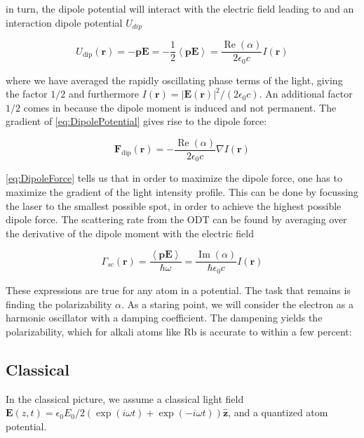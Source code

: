 in turn, the dipole potential will interact with the electric field leading to and an interaction dipole potential $U_{dip}$

\begin{equation}\label{eq:DipolePotential}
	U_{\text{dip}}(\mathbf{r}) = -\mathbf{p}\mathbf{E} = 
	-\frac{1}{2} \left\langle \mathbf{p}\mathbf{E} \right\rangle = \frac{\operatorname{Re}(\alpha)}{2\epsilon_0 c} I(\mathbf{r})
\end{equation}

where we have averaged the rapidly oscillating phase terms of the light, giving the factor $1/2$ and furthermore $I(\mathbf{r}) = |\mathbf{E}(\mathbf{r})|^2/(2\epsilon_0 c)$. An additional factor $1/2$ comes in because the dipole moment is induced and not permanent. The gradient of \cref{eq:DipolePotential} gives rise to the dipole force:

\begin{equation}\label{eq:DipoleForce}
	\mathbf{F}_{\text{dip}}(\mathbf{r}) = - \frac{\operatorname{Re}(\alpha)}{2\epsilon_0c}\nabla I(\mathbf{r})
\end{equation}

\cref{eq:DipoleForce} tells us that in order to maximize the dipole force, one has to maximize the gradient of the light intensity profile. This can be done by focussing the laser to the smallest possible spot, in order to achieve the highest possible dipole force. The scattering rate from the ODT can be found by averaging over the derivative of the dipole moment with the electric field 

\begin{equation}
	\Gamma_{sc}(\mathbf{r}) = \frac{\left\langle \mathbf{p} \mathbf{E} \right\rangle}{\hbar \omega}
	 = \frac{\operatorname{Im}(\alpha)}{\hbar \epsilon_0 c} I(\mathbf{r}) 
\end{equation}

These expressions are true for any atom in a potential. The task that remains is finding the polarizability $\alpha$. As a staring point, we will consider the electron as a harmonic oscillator with a damping coefficient. The dampening yields the polarizability, which for alkali atoms like Rb is accurate to within a few percent: 

\subsection{Classical}

In the classical picture, we assume a classical light field $\mathbf{E}(z,t) =\epsilon_0 E_0 / 2 \left(	
	\exp{(i \omega t)}+\exp{(-i \omega t)}
	\right)\hat{\mathbf{z}}$, and a quantized atom potential. 

